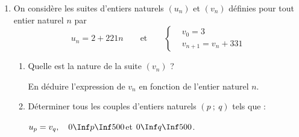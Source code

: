 \begin{colonne*exercice}
\begin{exercice}
\begin{enumerate}
\begin{enumerate}
\item Justifier que l'équation \enskip $(\text{E})\ :\ \enskip 221x - 331y = 1$\enskip admet des solutions entières.  
		 
\item Déterminer une solution particulière de l'équation (E).

(On pourra éventuellement remonter l'algorithme d'Euclide.)

\item Déterminer l'ensemble des couples $(x~;~y)$ d'entiers relatifs solutions de l'équation (E). 
\end{enumerate}

\item On considère les suites d'entiers naturels $(u_n)$ et $(v_n)$ définies pour tout entier naturel $n$ par 
\[
u_n = 2 + 221n
\qquad \text{et} \qquad \left\{\begin{aligned}
    &v_0=3\\ 
    &v_{n+1}=v_n + 331
  \end{aligned}\right.
\]

\begin{enumerate}
\item Quelle est la nature de la suite $(v_n)$ ? 

En déduire l'expression de $v_n$ en fonction de l'entier naturel $n$. 
\item Déterminer tous les couples d'entiers naturels $(p~;~q)$ tels
  que :
		
$u_p = v_q,\quad 0\Inf p\Inf500$\quad  et \quad $0\Inf q\Inf500$. 
\end{enumerate}
\end{enumerate}
\end{exercice}



\end{colonne*exercice}
